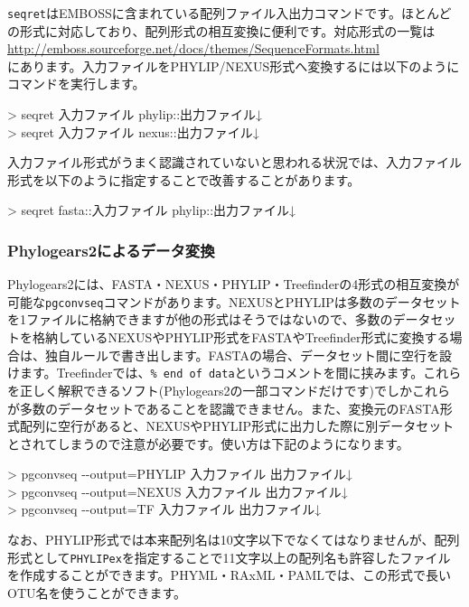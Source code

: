 \documentclass[titlepage,10pt,a4paper]{jsbook}
\newenvironment{cmd}{\begin{oframed}\raggedright\ttfamily\footnotesize\setlength{\baselineskip}{1.4em}}{\end{oframed}\vspace{-1em}}
\begin{document}
\texttt{seqret}はEMBOSSに含まれている配列ファイル入出力コマンドです。ほとんどの形式に対応しており、配列形式の相互変換に便利です。対応形式の一覧は\\
\href{http://emboss.sourceforge.net/docs/themes/SequenceFormats.html}{http://emboss.sourceforge.net/docs/themes/SequenceFormats.html}\\
にあります。入力ファイルをPHYLIP/NEXUS形式へ変換するには以下のようにコマンドを実行します。
\begin{cmd}
{\textgreater} seqret 入力ファイル phylip::出力ファイル↓\\
{\textgreater} seqret 入力ファイル nexus::出力ファイル↓
\end{cmd}
入力ファイル形式がうまく認識されていないと思われる状況では、入力ファイル形式を以下のように指定することで改善することがあります。
\begin{cmd}
{\textgreater} seqret fasta::入力ファイル phylip::出力ファイル↓
\end{cmd}

\subsubsection{Phylogears2によるデータ変換}

Phylogears2には、FASTA・NEXUS・PHYLIP・Treefinderの4形式の相互変換が可能な\texttt{pgconvseq}コマンドがあります。NEXUSとPHYLIPは多数のデータセットを1ファイルに格納できますが他の形式はそうではないので、多数のデータセットを格納しているNEXUSやPHYLIP形式をFASTAやTreefinder形式に変換する場合は、独自ルールで書き出します。FASTAの場合、データセット間に空行を設けます。Treefinderでは、\texttt{\% end of data}というコメントを間に挟みます。これらを正しく解釈できるソフト(Phylogears2の一部コマンドだけです)でしかこれらが多数のデータセットであることを認識できません。また、変換元のFASTA形式配列に空行があると、NEXUSやPHYLIP形式に出力した際に別データセットとされてしまうので注意が必要です。使い方は下記のようになります。
\begin{cmd}
{\textgreater} pgconvseq {-}{-}output=PHYLIP 入力ファイル 出力ファイル↓\\
{\textgreater} pgconvseq {-}{-}output=NEXUS 入力ファイル 出力ファイル↓\\
{\textgreater} pgconvseq {-}{-}output=TF 入力ファイル 出力ファイル↓
\end{cmd}
なお、PHYLIP形式では本来配列名は10文字以下でなくてはなりませんが、配列形式として\texttt{PHYLIPex}を指定することで11文字以上の配列名も許容したファイルを作成することができます。PHYML・RAxML・PAMLでは、この形式で長いOTU名を使うことができます。
\end{document}
